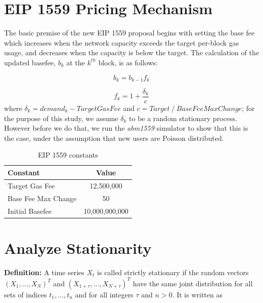 \documentclass{article}
\begin{document}
\section{EIP 1559 Pricing Mechanism}
\label{section:eip_1559}

The basic premise of the new EIP 1559 proposal begins with setting the base fee which increases when the network capacity exceeds the target per-block gas usage, and decreases when the capacity is below the target. The calculation of the updated basefee, $b_{k}$ at the $k^{th}$ block, is as follows:

\begin{equation}
b_{k} = b_{k-1}f_{k}
\label{eq:eip1559} 
\end{equation}

\begin{equation}
f_{k} = 1 + \frac{\delta_{k}}{c}
\label{eq:fk} 
\end{equation}
where $\delta_{k} = demand_{k} - Target Gas Fee$ and $c = Target ~/~ BaseFee Max Change$; for the purpose of this study, we assume $\delta_{k}$ to be a random stationary process. However before we do that, we run the \textit{abm1559} simulator \cite{Mon21} to show that this is the case, under the assumption that new users are Poisson distributed.


\begin{table}[h!]
\centering
\begin{tabular}{ |l|c| } 
\hline
 Constant & Value \\
\hline
Target Gas Fee & 12,500,000 \\
Base Fee Max Change & 50 \\
Initial Basefee & 10,000,000,000\\

\hline
\end{tabular}
\caption{EIP 1559 constants}
\label{table:pow_vs_pos}
\end{table}


\section{Analyze Stationarity}
\label{section:analyze_stationarity}

\textbf{Definition:} A time series ${X_{t}}$ is called strictly stationary if the random vectors $(X_{1} , ... , X_{N} )^T$ and $(X_{1+\tau} , ... , X_{N+\tau} )^T$ have the same joint distribution for all sets of indices ${t_{1} , ... , t_{n}}$ and for all integers $\tau$ and $n > 0$. It is written as 
\end{document}
